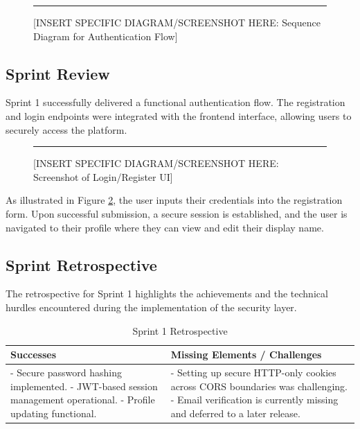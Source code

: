 \begin{figure}[h!]
    \centering
    \rule{0.8\textwidth}{5cm} %
    \caption{[INSERT SPECIFIC DIAGRAM/SCREENSHOT HERE: Sequence Diagram for Authentication Flow]}
    \label{fig:sprint1_sequence}
\end{figure}

\subsection{Sprint Review}
Sprint 1 successfully delivered a functional authentication flow. The registration and login endpoints were integrated with the frontend interface, allowing users to securely access the platform.

\begin{figure}[h!]
    \centering
    \rule{0.8\textwidth}{5cm} %
    \caption{[INSERT SPECIFIC DIAGRAM/SCREENSHOT HERE: Screenshot of Login/Register UI]}
    \label{fig:sprint1_ui}
\end{figure}

As illustrated in Figure \ref{fig:sprint1_ui}, the user inputs their credentials into the registration form. Upon successful submission, a secure session is established, and the user is navigated to their profile where they can view and edit their display name.

\subsection{Sprint Retrospective}
The retrospective for Sprint 1 highlights the achievements and the technical hurdles encountered during the implementation of the security layer.

\begin{table}[h!]
    \centering
    \begin{tabular}{|p{7cm}|p{7cm}|}
        \hline
        \textbf{Successes} & \textbf{Missing Elements / Challenges} \\
        \hline
        - Secure password hashing implemented. \newline - JWT-based session management operational. \newline - Profile updating functional. & - Setting up secure HTTP-only cookies across CORS boundaries was challenging. \newline - Email verification is currently missing and deferred to a later release. \\
        \hline
    \end{tabular}
    \caption{Sprint 1 Retrospective}
    \label{tab:sprint1_retro}
\end{table}


